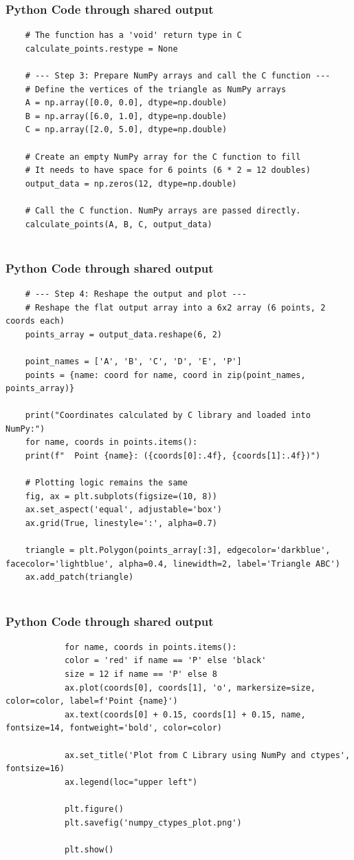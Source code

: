 \documentclass{beamer}
\begin{document}
	\begin{frame}[fragile]
		\frametitle{Python Code through shared output}
		\begin{lstlisting}
	# The function has a 'void' return type in C
	calculate_points.restype = None
	
	# --- Step 3: Prepare NumPy arrays and call the C function ---
	# Define the vertices of the triangle as NumPy arrays
	A = np.array([0.0, 0.0], dtype=np.double)
	B = np.array([6.0, 1.0], dtype=np.double)
	C = np.array([2.0, 5.0], dtype=np.double)
	
	# Create an empty NumPy array for the C function to fill
	# It needs to have space for 6 points (6 * 2 = 12 doubles)
	output_data = np.zeros(12, dtype=np.double)
	
	# Call the C function. NumPy arrays are passed directly.
	calculate_points(A, B, C, output_data)
	
		\end{lstlisting}
	\end{frame}
	\begin{frame}[fragile]
		\frametitle{Python Code through shared output}
		\begin{lstlisting}
	# --- Step 4: Reshape the output and plot ---
	# Reshape the flat output array into a 6x2 array (6 points, 2 coords each)
	points_array = output_data.reshape(6, 2)
	
	point_names = ['A', 'B', 'C', 'D', 'E', 'P']
	points = {name: coord for name, coord in zip(point_names, points_array)}
	
	print("Coordinates calculated by C library and loaded into NumPy:")
	for name, coords in points.items():
	print(f"  Point {name}: ({coords[0]:.4f}, {coords[1]:.4f})")
	
	# Plotting logic remains the same
	fig, ax = plt.subplots(figsize=(10, 8))
	ax.set_aspect('equal', adjustable='box')
	ax.grid(True, linestyle=':', alpha=0.7)
	
	triangle = plt.Polygon(points_array[:3], edgecolor='darkblue', facecolor='lightblue', alpha=0.4, linewidth=2, label='Triangle ABC')
	ax.add_patch(triangle)
	
		\end{lstlisting}	
	\end{frame}
		\begin{frame}[fragile]
		\frametitle{Python Code through shared output}
		\begin{lstlisting}
			for name, coords in points.items():
			color = 'red' if name == 'P' else 'black'
			size = 12 if name == 'P' else 8
			ax.plot(coords[0], coords[1], 'o', markersize=size, color=color, label=f'Point {name}')
			ax.text(coords[0] + 0.15, coords[1] + 0.15, name, fontsize=14, fontweight='bold', color=color)
			
			ax.set_title('Plot from C Library using NumPy and ctypes', fontsize=16)
			ax.legend(loc="upper left")
			
			plt.figure()
			plt.savefig('numpy_ctypes_plot.png')
			
			plt.show()
			
		\end{lstlisting}	
	\end{frame}
	
\end{document}
